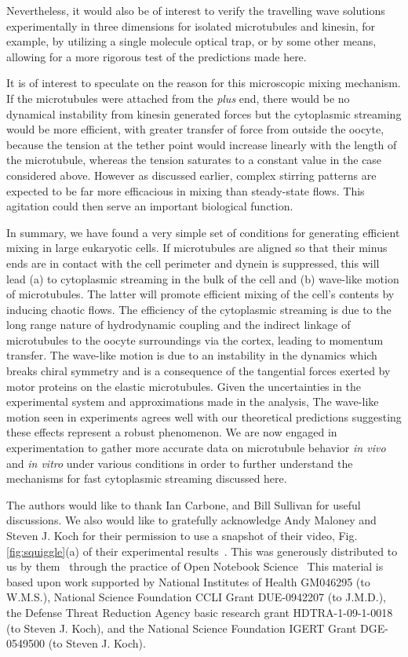 \documentclass[pre,showpacs]{revtex4}
\begin{document}
Nevertheless, it would also be of interest to verify the travelling wave solutions experimentally
in three dimensions for isolated
microtubules and kinesin, for example, by utilizing a single molecule optical trap, or by some other
means, allowing for a more rigorous test of the predictions made here.


It is of interest to speculate on the reason for this microscopic mixing
mechanism.  If the microtubules were attached from the {\em plus} end,
there would be no dynamical instability from kinesin generated forces
but the cytoplasmic streaming would be more efficient, with greater transfer
of force from outside the oocyte, because the tension at the
tether point would increase linearly with the length of the microtubule,
whereas the tension saturates to a constant value in the case considered
above. However as discussed earlier, complex stirring patterns are
expected to be far more efficacious in mixing than steady-state flows.
This agitation could then serve an important biological function.


In summary, we have found a very simple set of conditions for generating efficient mixing
in large eukaryotic cells. If microtubules are aligned so that their minus ends
are in contact with the cell perimeter and dynein is suppressed, this will lead 
(a) to cytoplasmic streaming in the bulk of the cell and (b) wave-like motion of
microtubules. The latter will promote efficient mixing of the cell's contents by
inducing chaotic flows.
The efficiency of the cytoplasmic streaming is due to the long range nature of
hydrodynamic coupling and the indirect linkage of microtubules to the oocyte surroundings via the cortex, leading to momentum transfer.
The wave-like motion is due to an instability in the dynamics which breaks chiral
symmetry and is a consequence of the tangential forces exerted by motor proteins on the elastic
microtubules. Given the uncertainties in the experimental system and approximations
made in the analysis, The wave-like motion seen in experiments agrees well with our theoretical predictions
suggesting these effects represent a robust phenomenon.
We are now engaged in experimentation to gather more accurate data on microtubule behavior 
{\em in vivo} and {\em in vitro} under various conditions in order to further understand
the mechanisms for fast cytoplasmic streaming discussed here.

The authors would like to thank Ian Carbone, and Bill Sullivan for useful discussions.
We also would like to gratefully acknowledge Andy Maloney and Steven J. Koch for their permission
to use a snapshot of their video, Fig.  \ref{fig:squiggle}(a) \cite{MaloneyKochVideo} of their
experimental results~\cite{MaloneyHerskowitzKoch}. This was generously distributed to us
by them~\cite{KochLab} through the practice of Open Notebook Science~\cite{OpenNotebookScience} 
This material is based upon work supported by National Institutes of Health GM046295 (to W.M.S.), National Science Foundation
CCLI Grant DUE-0942207 (to J.M.D.),
the  Defense Threat Reduction Agency basic research grant HDTRA-1-09-1-0018 (to Steven J. Koch),
and the National Science Foundation IGERT Grant DGE-0549500 (to Steven J. Koch).
\end{document}
